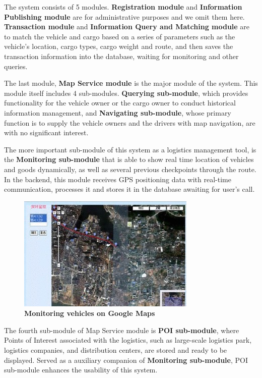\documentclass{egpubl}
\begin{document}
The system consists of 5 modules. \textbf{Registration module} and \textbf{Information Publishing module} are for administrative purposes and we omit them here. \textbf{Transaction module} and \textbf{Information Query and Matching module} are to match the vehicle and cargo based on a series of parameters such as the vehicle's location, cargo types, cargo weight and route, and then saves the transaction information into the database, waiting for monitoring and other queries.

The last module, \textbf{Map Service module} is the major module of the system. This module itself includes 4 sub-modules. \textbf{Querying sub-module}, which provides functionality for the vehicle owner or the cargo owner to conduct historical information management, and \textbf{Navigating sub-module}, whose primary function is to supply the vehicle owners and the drivers with map navigation, are with no significant interest.

The more important sub-module of this system as a logistics management tool, is the \textbf{Monitoring sub-module} that is able to show real time location of vehicles and goods dynamically, as well as several previous checkpoints through the route. In the backend, this module receives GPS positioning data with real-time communication, processes it and stores it in the database awaiting for user's call.

\begin{figure}[htb]
  \centering
  \includegraphics[width=.95\linewidth]{fig-3-1}
  \caption{\label{fig:fig-3-1} \textbf{Monitoring vehicles on Google Maps}}
\end{figure}

The fourth sub-module of Map Service module is \textbf{POI sub-module}, where Points of Interest associated with the logistics, such as large-scale logistics park, logistics companies, and distribution centers, are stored and ready to be displayed. Served as a auxiliary companion of \textbf{Monitoring sub-module}, POI sub-module enhances the usability of this system.
\end{document}
